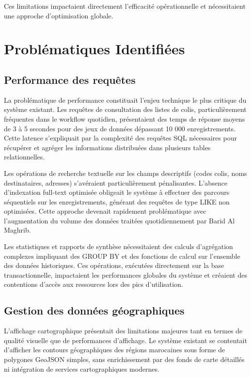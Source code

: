 Ces limitations impactaient directement l'efficacité opérationnelle et nécessitaient une approche d'optimisation globale.

\section{Problématiques Identifiées}

\subsection{Performance des requêtes}

La problématique de performance constituait l'enjeu technique le plus critique du système existant. Les requêtes de consultation des listes de colis, particulièrement fréquentes dans le workflow quotidien, présentaient des temps de réponse moyens de 3 à 5 secondes pour des jeux de données dépassant 10 000 enregistrements. Cette latence s'expliquait par la complexité des requêtes SQL nécessaires pour récupérer et agréger les informations distribuées dans plusieurs tables relationnelles.

Les opérations de recherche textuelle sur les champs descriptifs (codes colis, noms destinataires, adresses) s'avéraient particulièrement pénalisantes. L'absence d'indexation full-text optimisée obligeait le système à effectuer des parcours séquentiels sur les enregistrements, générant des requêtes de type LIKE non optimisées. Cette approche devenait rapidement problématique avec l'augmentation du volume des données traitées quotidiennement par Barid Al Maghrib.

Les statistiques et rapports de synthèse nécessitaient des calculs d'agrégation complexes impliquant des GROUP BY et des fonctions de calcul sur l'ensemble des données historiques. Ces opérations, exécutées directement sur la base transactionnelle, impactaient les performances globales du système et créaient des contentions d'accès aux ressources lors des pics d'utilisation.

\subsection{Gestion des données géographiques}

L'affichage cartographique présentait des limitations majeures tant en termes de qualité visuelle que de performances d'affichage. Le système existant se contentait d'afficher les contours géographiques des régions marocaines sous forme de polygones GeoJSON simples, sans enrichissement par des fonds de carte détaillés ni intégration de services cartographiques modernes.

